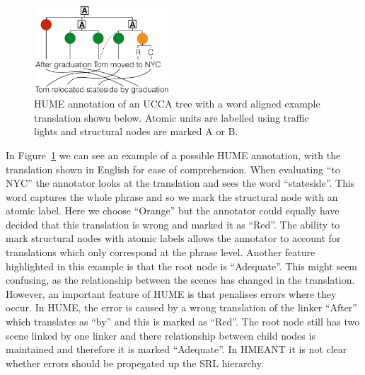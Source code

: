 \documentclass[11pt]{article}
\begin{document}
\begin{figure}
    \begin{center}
    \includegraphics[width=0.45\textwidth]{ucca-tree-mteval-v2.png}
    \end{center}
  \caption{\label{fig:hume_tree_v2}
     HUME annotation of an UCCA tree with a word aligned example translation shown below. 
Atomic units are labelled using traffic lights and structural nodes are marked A or B.}
\end{figure}

In Figure~\ref{fig:hume_tree_v2} we can see an example of a possible HUME annotation, with the translation shown in English for ease of comprehension. When evaluating ``to NYC'' the annotator looks at the translation and sees the word ``stateside''. This word captures the whole phrase and so we mark the structural node with an atomic label. Here we choose ``Orange'' but the annotator could equally have decided that this translation is wrong and marked it as ``Red''. The ability to mark structural nodes with atomic labels allows the annotator to account for translations which only correspond at the phrase level. Another feature highlighted in this example is that the root node is ``Adequate''. This might seem confusing, as the relationship between the scenes has changed in the translation. However, an important feature of HUME is that penalises errors where they occur. In HUME, the error is caused by a wrong translation of the linker ``After'' which translates as ``by'' and this is marked as ``Red''. The root node still has two scene linked by one linker and there relationship between child nodes is maintained and therefore it is marked ``Adequate''. In HMEANT it is not clear whether errors should be propegated up the SRL hierarchy. 
\end{document}
